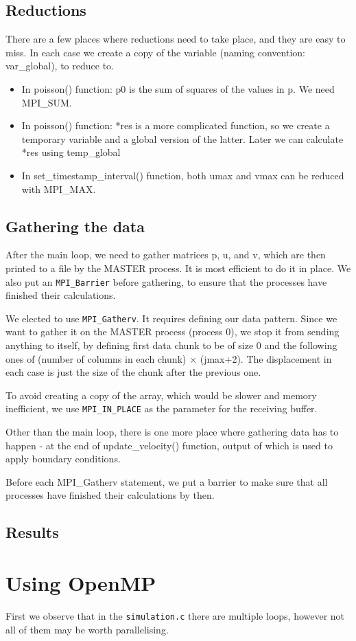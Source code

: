 \documentclass[11pt,journal]{article}
\begin{document}
	\subsection{Reductions}
	There are a few places where reductions need to take place, and they are easy to miss. In each case we create a copy of the variable (naming convention: var\_global), to reduce to.
	 \begin{itemize}
	 	\item In poisson() function: p0 is the sum of squares of the values in p. We need MPI\_SUM.
	 	\item In poisson() function: *res is a more complicated function, so we create a temporary variable and a global version of the latter. Later we can calculate *res using temp\_global
	 	\item In set\_timestamp\_interval() function, both umax and vmax can be reduced with MPI\_MAX.
	 \end{itemize}
 

	
	\subsection{Gathering the data}
	After the main loop, we need to gather matrices p, u, and v, which are then printed to a file by the MASTER process. It is most efficient to do it in place. We also put an \texttt{MPI\_Barrier} before gathering, to ensure that the processes have finished their calculations.
	
	We elected to use \texttt{MPI\_Gatherv}. It requires defining our data pattern. Since we want to gather it on the MASTER process (process 0), we stop it from sending anything to itself, by defining first data chunk to be of size 0 and the following ones of (number of columns in each chunk) $\times$ (jmax+2). The displacement in each case is just the size of the chunk after the previous one.
	
	To avoid creating a copy of the array, which would be slower and memory inefficient, we use \texttt{MPI\_IN\_PLACE} as the parameter for the receiving buffer. 

	Other than the main loop, there is one more place where gathering data has to happen - at the end of update\_velocity() function, output of which is used to apply boundary conditions.
	
	Before each MPI\_Gatherv statement, we put a barrier to make sure that all processes have finished their calculations by then.
	
	\subsection{Results}
	\pagebreak
	\section{Using OpenMP}
	First we observe that in the \texttt{simulation.c} there are multiple loops, however not all of them may be worth parallelising.  
	

\end{document}

